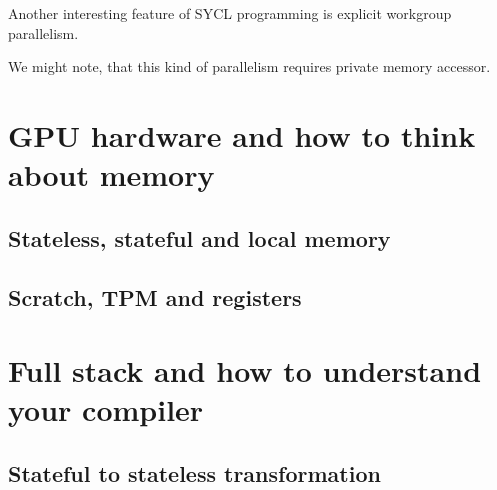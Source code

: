 \documentclass[a4paper,12pt,oneside]{article}
\begin{document}

Another interesting feature of SYCL programming is explicit workgroup parallelism.


We might note, that this kind of parallelism requires private memory accessor.

\section{GPU hardware and how to think about memory}\label{sec:GPUHW}


\subsection{Stateless, stateful and local memory}\label{subsec:StatelessFull}


\subsection{Scratch, TPM and registers}\label{subsec:ScratchTPM}


\section{Full stack and how to understand your compiler}\label{sec:Compiler}


\subsection{Stateful to stateless transformation}\label{subsec:ToStateless}

\end{document}
